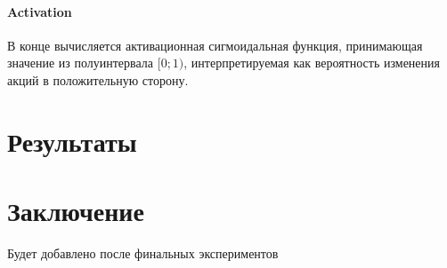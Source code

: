 \documentclass[14pt]{matmex-diploma-custom}
\begin{document}
\paragraph{Activation}

В конце вычисляется активационная сигмоидальная функция, принимающая значение из полуинтервала $[0;1)$, интерпретируемая как вероятность изменения акций в положительную сторону.

\clearpage\section{Результаты}



\clearpage\section*{Заключение}

Будет добавлено после финальных экспериментов

\setmonofont[Mapping=tex-text]{CMU Typewriter Text}


\end{document}
